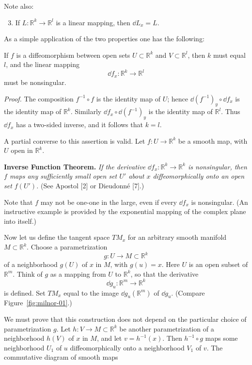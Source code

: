 Note also:

\begin{enumerate}
\setcounter{enumi}{2}
\item If $L : \mathbb{R}^k \to \mathbb{R}^l$ is a linear mapping, then $\dd L_x = L$.
\end{enumerate}

As a simple application of the two properties one has the following:

If $f$ is a diffeomorphism between open sets $U \subset \mathbb{R}^k$ and $V \subset \mathbb{R}^l$, then $k$ must equal $l$, and the linear mapping
\[
\dd f_x : \mathbb{R}^k \to \mathbb{R}^l
\]
must be nonsingular.

\noindent\textit{Proof.}
The composition $f^{-1} \circ f$ is the identity map of $U$; hence
$\dd(f^{-1})_y \circ \dd f_x$ is the identity map of $\mathbb{R}^k$. Similarly $\dd f_x \circ \dd(f^{-1})_y$ is the identity map of $\mathbb{R}^l$. Thus $\dd f_x$ has a two-sided inverse, and it follows that $k = l$.

A partial converse to this assertion is valid. Let $f : U \to \mathbb{R}^k$ be a smooth map, with $U$ open in $\mathbb{R}^k$.

\noindent\textbf{Inverse Function Theorem.} \textit{If the derivative $\dd f_x : \mathbb{R}^k \to \mathbb{R}^k$ is nonsingular, then $f$ maps any sufficiently small open set $U'$ about $x$ diffeomorphically onto an open set $f(U')$.} (See Apostol [2] or Dieudonn\'e [7].)

Note that $f$ may not be one-one in the large, even if every $\dd f_x$ is nonsingular. (An instructive example is provided by the exponential mapping of the complex plane into itself.)

Now let us define the tangent space $TM_x$ for an arbitrary smooth manifold $M \subset \mathbb{R}^k$. Choose a parametrization
\[
g: U \to M \subset \mathbb{R}^k
\]
of a neighborhood $g(U)$ of $x$ in $M$, with $g(u) = x$. Here $U$ is an open subset of $\mathbb{R}^m$. Think of $g$ as a mapping from $U$ to $\mathbb{R}^k$, so that the derivative
\[
\dd g_u : \mathbb{R}^m \to \mathbb{R}^k
\]
is defined. Set $TM_x$ equal to the image $\dd g_u(\mathbb{R}^m)$ of $\dd g_u$. (Compare Figure~\ref{fig:milnor-01}.)

We must prove that this construction does not depend on the particular choice of parametrization $g$. Let $h : V \to M \subset \mathbb{R}^k$ be another parametrization of a neighborhood $h(V)$ of $x$ in $M$, and let $v = h^{-1}(x)$. Then $h^{-1} \circ g$ maps some neighborhood $U_1$ of $u$ diffeomorphically onto a neighborhood $V_1$ of $v$. The commutative diagram of smooth maps


